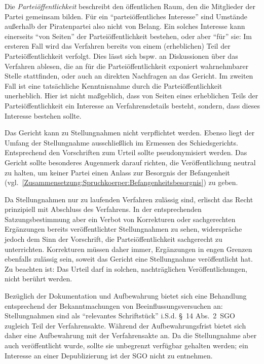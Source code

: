 Die \emph{Parteiöffentlichkeit} beschreibt den öffentlichen Raum, den die Mitglieder der Partei gemeinsam bilden.
Für ein \enquote{parteiöffentliches Interesse} sind Umstände außerhalb der Piratenpartei also nicht von Belang.
Ein solches Interesse kann einerseits \enquote{von Seiten} der Parteiöffentlichkeit bestehen, oder aber \enquote{für} sie:
Im ersteren Fall wird das Verfahren bereits von einem (erheblichen) Teil der Parteiöffentlichkeit verfolgt.
Dies lässt sich bspw. an Diskussionen über das Verfahren ablesen, die an für die Parteiöffentlichkeit exponiert wahrnehmbarer Stelle stattfinden, oder auch an direkten Nachfragen an das Gericht.
Im zweiten Fall ist eine tatsächliche Kenntnisnahme durch die Parteiöffentlichkeit unerheblich.
Hier ist nicht maßgeblich, dass von Seiten eines erheblichen Teils der Parteiöffentlichkeit ein Interesse an Verfahrensdetails besteht, sondern, dass dieses Interesse bestehen sollte.

Das Gericht kann zu Stellungnahmen nicht verpflichtet werden.
Ebenso liegt der Umfang der Stellungnahme ausschließlich im Ermessen des Schiedsgerichts.
Entsprechend den Vorschriften zum Urteil sollte pseudonymisiert werden.
Das Gericht sollte besonderes Augenmerk darauf richten, die Veröffentlichung neutral zu halten, um keiner Partei einen Anlass zur Besorgnis der Befangenheit (vgl.~\ref{Zusammensetzung:Spruchkoerper:Befangenheitsbesorgnis}) zu geben.

Da Stellungnahmen nur zu laufenden Verfahren zulässig sind, erlischt das Recht prinzipiell mit Abschluss des Verfahrens.
In der entsprechenden Satzungsbestimmung aber ein Verbot von Korrekturen oder sachgerechten Ergänzungen bereits veröffentlichter Stellungnahmen zu sehen, widerspräche jedoch dem Sinn der Vorschrift, die Parteiöffentlichkeit sachgerecht zu unterrichten.
Korrekturen müssen daher immer, Ergänzungen in engen Grenzen ebenfalls zulässig sein, soweit das Gericht eine Stellungnahme veröffentlicht hat.
Zu beachten ist:
Das Urteil darf in solchen, nachträglichen Veröffentlichungen, nicht berührt werden.

Bezüglich der Dokumentation und Aufbewahrung bietet sich eine Behandlung entsprechend der Bekanntmachungen von Beeinflussungsversuchen an:
Stellungnahmen sind als \enquote{relevantes Schriftstück} i.S.d. \S~14 Abs.~2~SGO zugleich Teil der Verfahrensakte.
Während der Aufbewahrungsfrist bietet sich daher eine Aufbewahrung mit der Verfahrensakte an.
Da die Stellungnahme aber auch veröffentlicht wurde, sollte sie unbegrenzt verfügbar gehalten werden; ein Interesse an einer Depublizierung ist der SGO nicht zu entnehmen.

